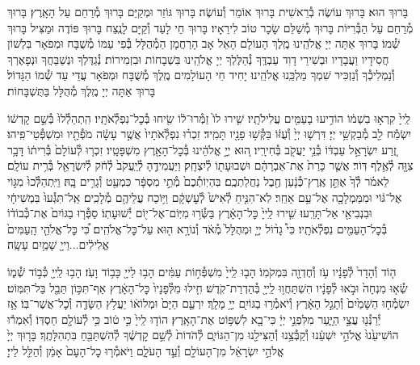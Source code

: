 \documentclass[twoside, openany, parskip=half, 11pt]{book}
\begin{document}
בָּרוּךְ הוּא׃
בָּרוּךְ עוֹשֶׂה בְ֯רֵאשִׁית בָּרוּךְ אוֹמֵר וְ֯עוֹשֶׂה׃
בָּרוּךְ גּוֹזֵר וּמְקַיֵּם בָּרוּךְ מְ֯רַחֵם עַל הָאָֽרֶץ׃
בָּרוּךְ מְ֯רַחֵם עַל הַבְּ֯רִיּוֹת בָּרוּךְ מְ֯שַׁלֵּם שָׂכָר טוֹב לִירֵאָיו׃
בָּרוּךְ חַי לָעַד וְ֯קַיָּם לָנֶֽצַח בָּרוּךְ פּוֹדֶה וּמַצִּיל בָּרוּךְ שְׁ֯מוֹ׃
בָּרוּךְ אַתָּה יְיָ אֱלֹהֵֽינוּ מֶֽלֶךְ הָעוֹלָם הָאֵל אָב הָרַחֲמָן הַמְ֯הֻלָּל בְּ֯פִי עַמּוֹ מְ֯שֻׁבָּח וּמְפֹאָר בִּלְשׁוֹן חֲסִידָיו וַעֲבָדָיו וּבְשִׁירֵי דָוִד עַבְדֶּֽךָ נְ֯הַלֶּלְךָ יְיָ אֱלֹהֵֽינוּ בִּשְׁבָחוֹת וּבִזְמִירוֹת׃ נְ֯גַדֶּלְךָ וּנְשַׁבֵּחֲךָ וּנְפָאֶרְךָ וְ֯נַמְלִיכְ֯ךָ וְ֯נַזְכִּיר שִׁמְךָ מַלְכֵּֽנוּ אֱלֹהֵֽינוּ׃
יָחִיד חֵי הָעוֹלָמִים מֶֽלֶךְ מְ֯שֻׁבָּח וּמְפֹאָר עֲדֵי עַד שְׁ֯מוֹ הַגָּדוֹל׃ בָּרוּךְ אַתָּה יְיָ מֶֽלֶךְ מְ֯הֻלָּל בַּתֻּשְׁבָּחוֹת׃

לַֽייָ֙ קִרְא֣וּ בִשְׁמ֔וֹ
הוֹדִ֥יעוּ בָעַמִּ֖ים עֲלִילֹתָֽיו׃
שִׁ֤ירוּ לוֹ֙ זַמְּ֯רוּ־ל֔וֹ שִׂ֖יחוּ בְּ֯כׇל־נִפְלְ֯אֹתָֽיו׃
הִֽתְהַלְ֯לוּ֙ בְּ֯שֵׁ֣ם קׇדְשׁ֔וֹ יִשְׂמַ֕ח לֵ֖ב מְ֯בַקְשֵׁ֥י יְיָ׃
דִּרְשׁ֤וּ יְיָ֙ וְ֯עֻזּ֔וֹ בַּקְּ֯שׁ֥וּ פָנָ֖יו תָּמִֽיד׃
זִכְר֗וּ נִפְלְ֯אֹתָיו֙ אֲשֶׁ֣ר עָשָׂ֔ה מֹפְ֯תָ֖יו וּמִשְׁפְּ֯טֵי־פִֽיהוּ׃
זֶ֚רַע יִשְׂרָאֵ֣ל עַבְדּ֔וֹ בְּ֯נֵ֥י יַעֲקֹ֖ב בְּ֯חִירָֽיו׃
ה֚וּא יְיָ֣ אֱלֹהֵ֔ינוּ בְּ֯כׇל־הָאָ֖רֶץ מִשְׁפָּטָֽיו׃
זִכְר֤וּ לְ֯עוֹלָם֙ בְּ֯רִית֔וֹ דָּבָ֥ר צִוָּ֖ה לְ֯אֶ֥לֶף דּֽוֹר׃
אֲשֶׁ֤ר כָּרַת֙ אֶת־אַבְרָהָ֔ם וּשְׁבוּעָת֖וֹ לְ֯יִצְחָֽק׃
וַיַּעֲמִידֶ֤הָ לְ֯יַֽעֲקֹב֙ לְ֯חֹ֔ק לְ֯יִשְׂרָאֵ֖ל בְּ֯רִ֥ית עוֹלָֽם׃
לֵאמֹ֗ר לְ֯ךָ֙ אֶתֵּ֣ן אֶֽרֶץ־כְּ֯נָ֔עַן חֶ֖בֶל נַחֲלַתְכֶֽם׃
בִּהְיֽוֹתְ֯כֶם֙ מְ֯תֵ֣י מִסְפָּ֔ר כִּמְעַ֖ט וְ֯גָרִ֥ים בׇּֽהּ׃
וַיִּֽתְהַלְּ֯כוּ֙ מִגּ֣וֹי אֶל־גּ֔וֹי וּמִמַּמְלָכָ֖ה אֶל־עַ֥ם אַחֵֽר׃
לֹֽא־הִנִּ֤יחַ לְ֯אִישׁ֙ לְ֯עׇשְׁקָ֔ם וַיּ֥וֹכַח עֲלֵיהֶ֖ם מְ֯לָכִֽים׃
אַֽל־תִּגְּ֯עוּ֙ בִּמְשִׁיחָ֔י וּבִנְבִיאַ֖י אַל־תָּרֵֽעוּ׃
שִׁ֤ירוּ לַֽייָ֙ כׇּל־הָאָ֔רֶץ בַּשְּׂ֯ר֥וּ מִיּֽוֹם־אֶל־י֖וֹם יְ֯שׁוּעָתֽוֹ׃
סַפְּ֯ר֤וּ בַגּוֹיִם֙ אֶת־כְּ֯בוֹד֔וֹ בְּ֯כׇל־הָעַמִּ֖ים נִפְלְ֯אֹתָֽיו׃
כִּי֩ גָד֨וֹל יְיָ֤ וּמְהֻלָּל֙ מְ֯אֹ֔ד וְ֯נוֹרָ֥א ה֖וּא עַל־כׇּל־אֱלֹהִֽים׃
כִּ֠י כׇּל־אֱלֹהֵ֤י הָֽעַמִּים֙ אֱלִילִ֔ים...וַייָ֖ שָׁמַ֥יִם עָשָֽׂה׃

ה֤וֹד וְ֯הָדָר֙ לְ֯פָנָ֔יו עֹ֥ז וְ֯חֶדְוָ֖ה בִּמְקֹמֽוֹ׃
הָב֤וּ לַֽייָ֙ מִשְׁפְּ֯ח֣וֹת עַמִּ֔ים הָב֥וּ לַייָ֖ כָּב֥וֹד וָעֹֽז׃
הָב֥וּ לַֽייָ֖ כְּ֯ב֣וֹד שְׁ֯מ֑וֹ שְׂ֯א֤וּ מִנְחָה֙ וּבֹ֣אוּ לְ֯פָנָ֔יו
הִשְׁתַּחֲו֥וּ לַֽייָ֖ בְּ֯הַדְרַת־קֹֽדֶשׁ׃ חִ֤ילוּ מִלְּ֯פָנָיו֙ כׇּל־הָאָ֔רֶץ
אַף־תִּכּ֥וֹן תֵּבֵ֖ל בַּל־תִּמּֽוֹט׃ יִשְׂמְ֯ח֤וּ הַשָּׁמַ֙יִם֙ וְ֯תָגֵ֣ל הָאָ֔רֶץ
וְ֯יֹאמְ֯ר֥וּ בַגּוֹיִ֖ם יְיָ֥ מָלָֽךְ׃ יִרְעַ֤ם הַיָּם֙ וּמְלוֹא֔וֹ
יַעֲלֹ֥ץ הַשָּׂדֶ֖ה וְ֯כׇל־אֲשֶׁר־בּֽוֹ׃ אָ֥ז יְ֯רַנְּ֯נ֖וּ עֲצֵ֣י הַיָּ֑עַר
מִלִּפְנֵ֣י יְיָ֔ כִּי־בָ֖א לִשְׁפּ֥וֹט אֶת־הָאָֽרֶץ׃ הוֹד֤וּ לַֽייָ֙ כִּ֣י ט֔וֹב
כִּ֥י לְ֯עוֹלָ֖ם חַסְדּֽוֹ׃ וְ֯אִמְר֕וּ הוֹשִׁיעֵ֙נוּ֙ אֱלֹהֵ֣י יִשְׁעֵ֔נוּ
וְ֯קַבְּ֯צֵ֥נוּ וְ֯הַצִּילֵ֖נוּ מִן־הַגּוֹיִ֑ם לְ֯הֹדוֹת֙ לְ֯שֵׁ֣ם קׇדְשֶׁ֔ךָ
לְ֯הִשְׁתַּבֵּ֖חַ בִּתְהִלָּתֶֽךָ׃ בָּר֤וּךְ יְיָ֙ אֱלֹהֵ֣י יִשְׂרָאֵ֔ל
מִן־הָעוֹלָ֖ם וְ֯עַ֣ד הָעֹלָ֑ם וַיֹּאמְ֯ר֤וּ כׇל־הָעָם֙ אָמֵ֔ן וְ֯הַלֵּ֖ל לַייָ׃\\
\end{document}
